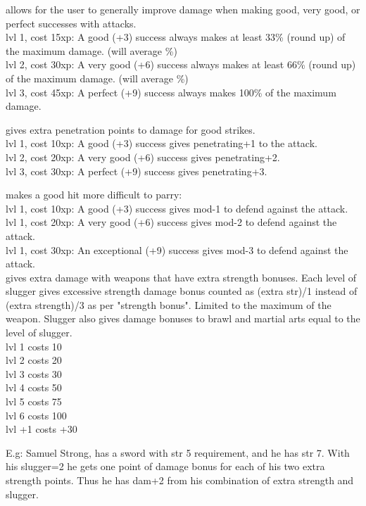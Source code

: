  allows for the user to generally improve damage when making good, very good, or perfect successes with attacks. \\
lvl 1, cost 15xp: A good (+3) success always makes at least 33\% (round up) of the maximum damage. (will average \%) \\
lvl 2, cost 30xp: A very good (+6) success always makes at least 66\% (round up) of the maximum damage. (will average \%) \\
lvl 3, cost 45xp: A perfect (+9) success always makes 100\% of the maximum damage.


 gives extra penetration points to damage for good strikes. \\
lvl 1, cost 10xp: A good (+3) success gives penetrating+1 to the attack. \\
lvl 2, cost 20xp: A very good (+6) success gives penetrating+2. \\
lvl 3, cost 30xp: A perfect (+9) success gives penetrating+3.


 makes a good hit more difficult to parry: \\
lvl 1, cost 10xp: A good (+3) success gives mod-1 to defend against the attack.  \\
lvl 1, cost 20xp: A very good (+6) success gives mod-2 to defend against the attack.  \\
lvl 1, cost 30xp: An exceptional (+9) success gives mod-3 to defend against the attack.  \\


 gives extra damage with weapons that have extra strength bonuses. Each level of slugger gives excessive strength damage bonus counted as (extra str)/1 instead of (extra strength)/3 as per "strength bonus". Limited to the maximum of the weapon. Slugger also gives damage bonuses to brawl and martial arts equal to the level of slugger. \\
lvl  1  costs  10 \\
lvl  2  costs  20 \\
lvl  3  costs  30 \\
lvl  4  costs  50 \\
lvl  5  costs  75 \\
lvl  6  costs 100 \\
lvl +1  costs +30

E.g: Samuel Strong, has a sword with str 5 requirement, and he has str 7. With his slugger=2 he gets one point of damage bonus for each of his two extra strength points. Thus he has dam+2 from his combination of extra strength and slugger.


